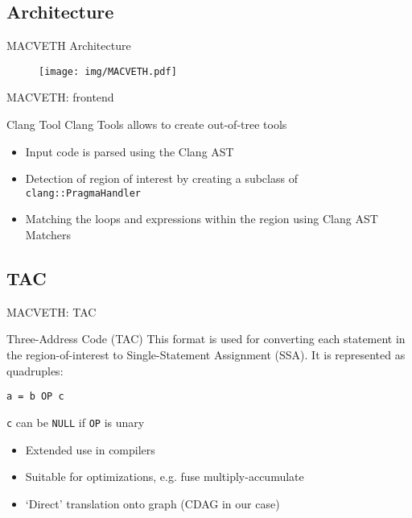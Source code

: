 \documentclass[xcolor=table,hideothersubsections,aspectratio=1610]{beamer}
\begin{document}
\subsection{Architecture}
\begin{frame}{MACVETH Architecture}
\begin{figure}
    \centering
    \texttt{[image: img/MACVETH.pdf]}
\end{figure}
\end{frame}

\begin{frame}{MACVETH: frontend}
\begin{block}{Clang Tool}
Clang Tools allows to create out-of-tree tools
\end{block}
\begin{itemize}
    \item Input code is parsed using the Clang AST
    \item Detection of region of interest by creating a subclass of \texttt{clang::PragmaHandler}
    \item Matching the loops and expressions within the region using Clang AST Matchers
\end{itemize}
\end{frame}


\subsection{TAC}
\begin{frame}{MACVETH: TAC}
\begin{block}{Three-Address Code (TAC)}
This format is used for converting each statement in the region-of-interest to Single-Statement Assignment (SSA). It is represented as quadruples:
\begin{center}
    \texttt{a = b OP c}
\end{center}
\texttt{c} can be \texttt{NULL} if \texttt{OP} is unary
\end{block}

\begin{itemize}
    \item Extended use in compilers
    \item Suitable for optimizations, e.g. fuse multiply-accumulate
    \item `Direct' translation onto graph (CDAG in our case)
\end{itemize}

\end{frame}
\end{document}
